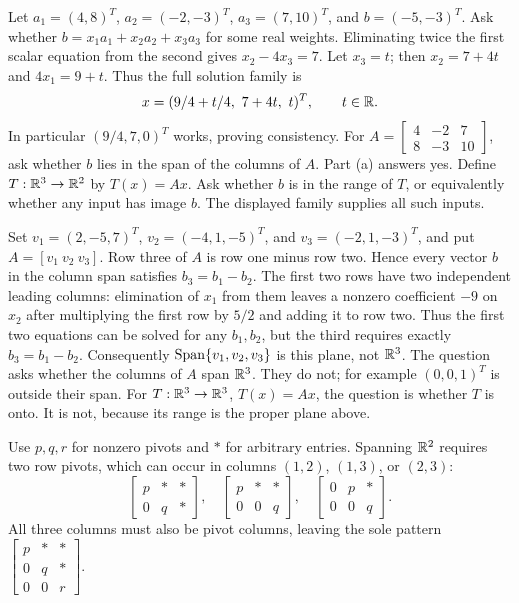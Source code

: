 Let $a_1=(4,8)^T$, $a_2=(-2,-3)^T$, $a_3=(7,10)^T$,
and $b=(-5,-3)^T$.
Ask whether $b=x_1a_1+x_2a_2+x_3a_3$ for some real weights.
Eliminating twice the first scalar equation from the second gives
$x_2-4x_3=7$. Let $x_3=t$; then $x_2=7+4t$ and
$4x_1=9+t$. Thus the full solution family is
\[
 x=(9/4+t/4,\ 7+4t,\ t)^T,\qquad t\in\mathbb{R}.
\]
In particular $(9/4,7,0)^T$ works, proving consistency.
For $A=\begin{bmatrix}4&-2&7\\8&-3&10\end{bmatrix}$, ask
whether $b$ lies in the span of the columns of $A$. Part (a) answers yes.
Define $T:\mathbb{R}^3\to\mathbb{R}^2$ by $T(x)=Ax$. Ask whether $b$ is
in the range of $T$, or equivalently whether any input has image $b$.
The displayed family supplies all such inputs.

Set $v_1=(2,-5,7)^T$, $v_2=(-4,1,-5)^T$, and
$v_3=(-2,1,-3)^T$, and put $A=[v_1\ v_2\ v_3]$.
Row three of $A$ is row one minus row two. Hence every vector
$b$ in the column span satisfies $b_3=b_1-b_2$. The first two
rows have two independent leading columns: elimination of $x_1$
from them leaves a nonzero coefficient $-9$ on $x_2$ after
multiplying the first row by $5/2$ and adding it to row two.
Thus the first two equations can be solved for any $b_1,b_2$,
but the third requires exactly $b_3=b_1-b_2$.
Consequently $\operatorname{Span}\{v_1,v_2,v_3\}$ is this plane, not $\mathbb{R}^3$.
The question asks whether the columns of $A$ span $\mathbb{R}^3$.
They do not; for example $(0,0,1)^T$ is outside their span.
For $T:\mathbb{R}^3\to\mathbb{R}^3$, $T(x)=Ax$, the question is whether
$T$ is onto. It is not, because its range is the proper plane above.

Use $p,q,r$ for nonzero pivots and $*$ for arbitrary entries.
Spanning $\mathbb{R}^2$ requires two row pivots, which can occur in columns
$(1,2)$, $(1,3)$, or $(2,3)$:
\[
 \begin{bmatrix}p&*&*\\0&q&*\end{bmatrix},\quad
 \begin{bmatrix}p&*&*\\0&0&q\end{bmatrix},\quad
 \begin{bmatrix}0&p&*\\0&0&q\end{bmatrix}.
\]
All three columns must also be pivot columns, leaving the sole pattern
$\begin{bmatrix}p&*&*\\0&q&*\\0&0&r\end{bmatrix}$.

